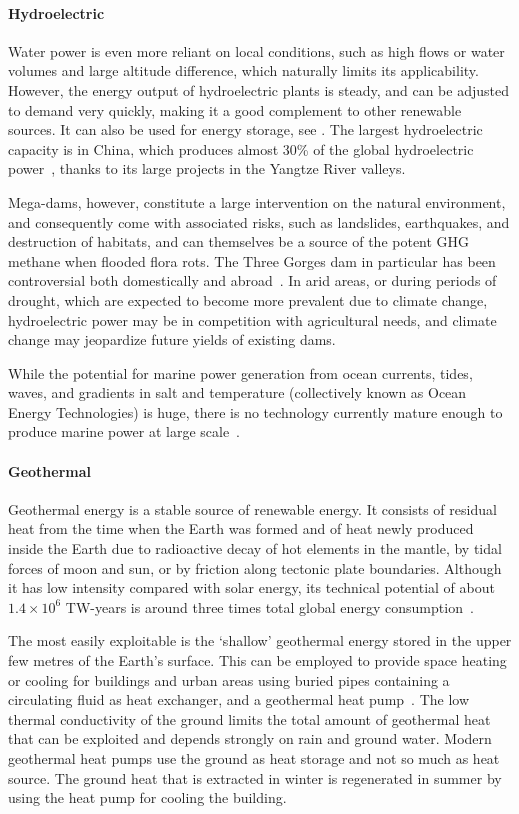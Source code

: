 \documentclass[../SustainableHEP.tex]{subfiles}
\begin{document}
\paragraph{Hydroelectric}

Water power is even more reliant on local conditions, such as high flows or water volumes and large altitude difference, which naturally limits its applicability.  However, the energy output of hydroelectric plants is steady, and can be adjusted to demand very quickly, making it a good complement to other renewable sources. It can also be used for energy storage, see . The largest hydroelectric capacity is in China, which produces almost 30\% of the global hydroelectric power~\cite{IHA2021}, thanks to its large projects in the Yangtze River valleys.

Mega-dams, however, constitute a large intervention on the natural environment, and consequently come with associated risks, such as landslides, earthquakes, and destruction of habitats, and can themselves be a source of the potent GHG methane when flooded flora rots. The Three Gorges dam in particular has been controversial both domestically and abroad~\cite{ThreeGorges}. In arid areas, or during periods of drought, which are expected to become more prevalent due to climate change, hydroelectric power may be in competition with agricultural needs, and climate change may jeopardize future yields of existing dams.

While the potential for marine power generation from ocean currents, tides, waves, and gradients in salt and temperature (collectively known as Ocean Energy Technologies) is huge, there is no technology currently mature enough to produce marine power at large scale~\cite{OET}.

\paragraph{Geothermal}

Geothermal energy is a stable source of renewable energy. It consists of residual heat from the time when the Earth was formed and of heat newly produced inside the Earth due to radioactive decay of hot elements in the mantle, by tidal forces of moon and sun, or by friction along tectonic plate boundaries. Although it has low intensity compared with solar energy, its technical potential of about $1.4 \times10^6$ TW-years is around three times total global energy consumption~\cite{Britannica}.

The most easily exploitable is the `shallow' geothermal energy stored in the upper few metres of the Earth's surface.  This can be employed to provide space heating or cooling for buildings and urban areas using buried pipes containing a circulating fluid as heat exchanger, and a geothermal heat pump~\cite{Narsilio2018}. The low thermal conductivity of the ground limits the total amount of geothermal heat that can be exploited and depends strongly on rain and ground water. Modern geothermal heat pumps use the ground as heat storage and not so much as heat source. The ground heat that is extracted in winter is regenerated in summer by using the heat pump for cooling the building.  
\end{document}
